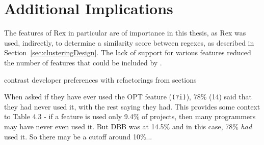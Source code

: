 \section{Additional Implications}

The features of Rex in particular are of importance in this thesis, as Rex was used, indirectly, to determine a similarity score between regexes, as described in Section~\ref{sec:clusteringDesign}.  The lack of support for various features reduced the number of features that could be included by .

contrast developer preferences with refactorings from sections





When asked if they have ever used the OPT feature (\verb!(?i)!), 78\% (14) said that they had never used it, with the rest saying they had.  This provides some context to Table 4.3 - if a feature is used only 9.4\% of projects, then many programmers may have never even used it.  But DBB was at 14.5\% and in this case, 78\% \emph{had} used it.  So there may be a cutoff around 10\%...



% 

